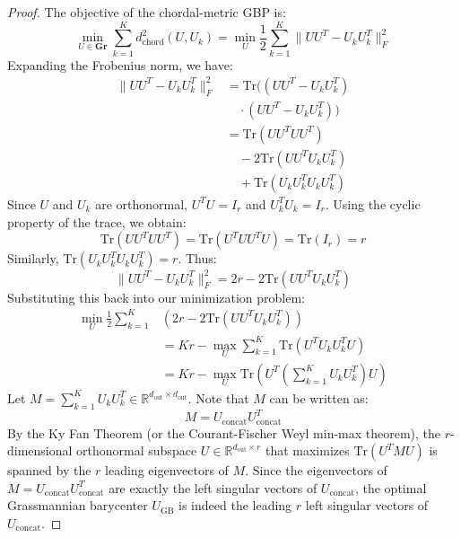 \documentclass{article}
\theoremstyle{plain}
\theoremstyle{definition}
\theoremstyle{remark}
\begin{document}
\begin{proof}
The objective of the chordal-metric GBP is:
\begin{equation}
    \min_{U \in \mathbf{Gr}} \sum_{k=1}^K d^2_{\text{chord}}(U, U_k) = \min_{U} \frac{1}{2} \sum_{k=1}^K \| U U^T - U_k U_k^T \|_F^2
\end{equation}
Expanding the Frobenius norm, we have:
\begin{align*}
    \| U U^T - U_k U_k^T \|_F^2 &= \text{Tr}\big( (U U^T - U_k U_k^T) \\
    &\quad \cdot (U U^T - U_k U_k^T) \big) \\
    &= \text{Tr}(U U^T U U^T) \\
    &\quad - 2 \text{Tr}(U U^T U_k U_k^T) \\
    &\quad + \text{Tr}(U_k U_k^T U_k U_k^T)
\end{align*}
Since $U$ and $U_k$ are orthonormal, $U^T U = I_r$ and $U_k^T U_k = I_r$. Using the cyclic property of the trace, we obtain:
\begin{equation}
    \text{Tr}(U U^T U U^T) = \text{Tr}(U^T U U^T U) = \text{Tr}(I_r) = r
\end{equation}
Similarly, $\text{Tr}(U_k U_k^T U_k U_k^T) = r$. Thus:
\begin{equation}
    \| U U^T - U_k U_k^T \|_F^2 = 2r - 2\text{Tr}(U U^T U_k U_k^T)
\end{equation}
Substituting this back into our minimization problem:
\begin{align*}
    \min_{U} \frac{1}{2} \sum_{k=1}^K & (2r - 2\text{Tr}(U U^T U_k U_k^T)) \\
    &= Kr - \max_{U} \sum_{k=1}^K \text{Tr}(U^T U_k U_k^T U) \\
    &= Kr - \max_{U} \text{Tr}\left( U^T \left( \sum_{k=1}^K U_k U_k^T \right) U \right)
\end{align*}
Let $M = \sum_{k=1}^K U_k U_k^T \in \mathbb{R}^{d_{\text{out}} \times d_{\text{out}}}$. Note that $M$ can be written as:
\begin{equation}
    M = U_{\text{concat}} U_{\text{concat}}^T
\end{equation}
By the Ky Fan Theorem (or the Courant-Fischer Weyl min-max theorem), the $r$-dimensional orthonormal subspace $U \in \mathbb{R}^{d_{\text{out}} \times r}$ that maximizes $\text{Tr}(U^T M U)$ is spanned by the $r$ leading eigenvectors of $M$. Since the eigenvectors of $M = U_{\text{concat}} U_{\text{concat}}^T$ are exactly the left singular vectors of $U_{\text{concat}}$, the optimal Grassmannian barycenter $U_{\text{GB}}$ is indeed the leading $r$ left singular vectors of $U_{\text{concat}}$.
\end{proof}
\end{document}
